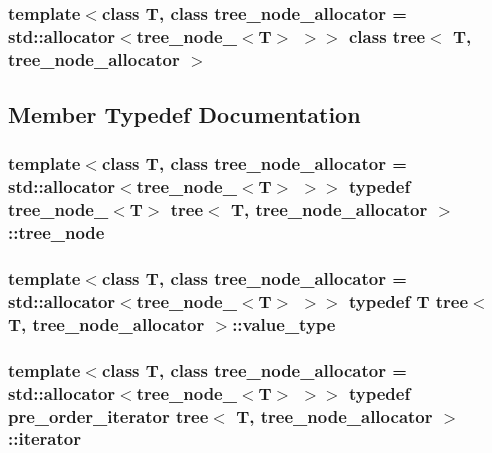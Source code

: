 \subsubsection*{template$<$class T, class tree\_\-node\_\-allocator = std::allocator$<$tree\_\-node\_\-$<$T$>$ $>$$>$ class tree$<$ T, tree\_\-node\_\-allocator $>$}



\subsection{Member Typedef Documentation}
\hypertarget{classtree_672d078d87ae97c58b732a940d7b8ca8}{
\subsubsection{\setlength{\rightskip}{0pt plus 5cm}template$<$class T, class tree\_\-node\_\-allocator = std::allocator$<$tree\_\-node\_\-$<$T$>$ $>$$>$ typedef {\bf tree\_\-node\_\-}$<$T$>$ {\bf tree}$<$ T, tree\_\-node\_\-allocator $>$::{\bf tree\_\-node}}}
\label{classtree_672d078d87ae97c58b732a940d7b8ca8}


\hypertarget{classtree_1e7bcd21e7420f7922a1bca79080acfa}{
\subsubsection{\setlength{\rightskip}{0pt plus 5cm}template$<$class T, class tree\_\-node\_\-allocator = std::allocator$<$tree\_\-node\_\-$<$T$>$ $>$$>$ typedef T {\bf tree}$<$ T, tree\_\-node\_\-allocator $>$::{\bf value\_\-type}}}
\label{classtree_1e7bcd21e7420f7922a1bca79080acfa}


\hypertarget{classtree_2079982538b88d21fe1ccea34fe7ce0e}{
\subsubsection{\setlength{\rightskip}{0pt plus 5cm}template$<$class T, class tree\_\-node\_\-allocator = std::allocator$<$tree\_\-node\_\-$<$T$>$ $>$$>$ typedef {\bf pre\_\-order\_\-iterator} {\bf tree}$<$ T, tree\_\-node\_\-allocator $>$::{\bf iterator}}}
\label{classtree_2079982538b88d21fe1ccea34fe7ce0e}




